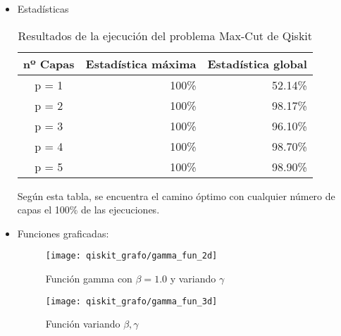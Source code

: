 \documentclass{article}
\begin{document}
\begin{itemize}
\item Estadísticas
  \begin{table}[htbp]
    \centering
    \begin{tabular}{|c|r|r|}
      \hline
      \textbf{nº Capas} & \textbf{Estadística máxima} & \textbf{Estadística global} \\ \hline
      p = 1 & 100\% & 52.14\% \\ \hline
      p = 2 & 100\% & 98.17\% \\ \hline
      p = 3 & 100\% & 96.10\% \\ \hline
      p = 4 & 100\% & 98.70\% \\ \hline
      p = 5 & 100\% & 98.90\% \\ \hline
    \end{tabular}
    \caption{Resultados de la ejecución del problema Max-Cut de Qiskit}
  \end{table}
  Según esta tabla, se encuentra el camino óptimo con cualquier número de capas el 100\% de las ejecuciones.

\item Funciones graficadas:
  \begin{figure}[htbp]
    \centering
    \texttt{[image: qiskit\_grafo/gamma\_fun\_2d]}
    \caption{Función gamma con \(\beta = 1.0\) y variando \(\gamma\)}
  \end{figure}
  \begin{figure}[htbp]
    \centering
    \texttt{[image: qiskit\_grafo/gamma\_fun\_3d]}
    \caption{Función variando \(\beta, \gamma\)}
  \end{figure}
\end{itemize}
\end{document}
